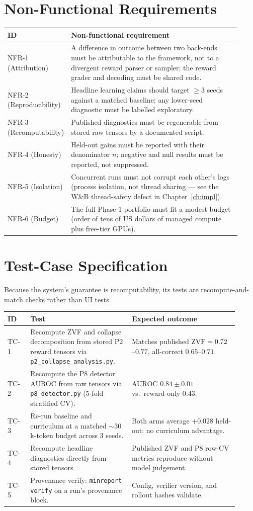 \section{Non-Functional Requirements}
\begin{longtable}{@{}L{0.10\linewidth}L{0.82\linewidth}@{}}
\toprule
\textbf{ID} & \textbf{Non-functional requirement} \\
\midrule
\endhead
NFR-1 (Attribution) & A difference in outcome between two back-ends must be
attributable to the framework, not to a divergent reward parser or sampler; the
reward grader and decoding must be shared code. \\
NFR-2 (Reproducibility) & Headline learning claims should target $\ge 3$ seeds
against a matched baseline; any lower-seed diagnostic must be labelled exploratory. \\
NFR-3 (Recomputability) & Published diagnostics must be regenerable from stored raw
tensors by a documented script. \\
NFR-4 (Honesty) & Held-out gains must be reported with their denominator $n$;
negative and null results must be reported, not suppressed. \\
NFR-5 (Isolation) & Concurrent runs must not corrupt each other's logs (process
isolation, not thread sharing --- see the W\&B thread-safety defect in
Chapter~\ref{ch:impl}). \\
NFR-6 (Budget) & The full Phase-1 portfolio must fit a modest budget (order of tens
of US dollars of managed compute plus free-tier GPUs). \\
\bottomrule
\end{longtable}

\section{Test-Case Specification}
Because the system's guarantee is recomputability, its tests are recompute-and-match
checks rather than UI tests.
\begin{longtable}{@{}L{0.09\linewidth}L{0.40\linewidth}L{0.42\linewidth}@{}}
\toprule
\textbf{ID} & \textbf{Test} & \textbf{Expected outcome} \\
\midrule
\endhead
TC-1 & Recompute ZVF and collapse decomposition from stored P2 reward tensors via
\texttt{p2\_collapse\_analysis.py}. & Matches published $\mathrm{ZVF}=0.72$--$0.77$,
all-correct $0.65$--$0.71$. \\
TC-2 & Recompute the P8 detector AUROC from raw tensors via
\texttt{p8\_detector.py} (5-fold stratified CV). & AUROC $0.84\pm0.01$ vs.\
reward-only $0.43$. \\
TC-3 & Re-run baseline and curriculum at a matched ${\sim}30$k-token budget across
3 seeds. & Both arms average $+0.028$ held-out; no curriculum advantage. \\
TC-4 & Recompute headline diagnostics directly from stored tensors. &
Published ZVF and P8 row-CV metrics reproduce without model judgement. \\
TC-5 & Provenance verify: \texttt{minreport verify} on a run's provenance block. &
Config, verifier version, and rollout hashes validate. \\
\bottomrule
\end{longtable}

